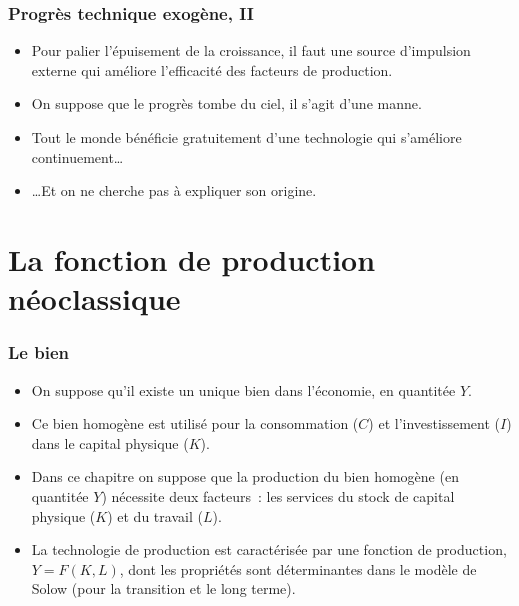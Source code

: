 \documentclass[10pt,notheorems]{beamer}
\theoremstyle{plain}
\theoremstyle{definition} %
\begin{document}
\begin{frame}
  \frametitle{Progrès technique exogène, II}

  \begin{itemize}

  \item Pour palier l'épuisement de la croissance, il faut une source d'impulsion externe qui améliore l'efficacité des facteurs de production.\newline

  \item On suppose que le progrès tombe du ciel, il s'agit d'une manne.\newline

  \item Tout le monde bénéficie gratuitement d'une technologie qui s'améliore continuement\ldots\newline

  \item \ldots Et on ne cherche pas à expliquer son origine.

  \end{itemize}
\end{frame}


\section{La fonction de production néoclassique}

\begin{frame}
  \frametitle{Le bien}

  \begin{itemize}

  \item On suppose qu'il existe un unique bien dans l'économie, en quantitée $Y$.\newline

  \item Ce bien homogène est utilisé pour la consommation ($C$) et l'investissement ($I$) dans le capital physique ($K$).\newline

  \item Dans ce chapitre on suppose que la production du bien homogène (en quantitée $Y$) nécessite deux facteurs~: les services du stock de capital physique ($K$) et du travail ($L$).\newline

  \item La technologie de production est caractérisée par une fonction de production, $Y = F(K,L)$, dont les propriétés sont déterminantes dans le modèle de Solow (pour la transition et le long terme).\newline

  \end{itemize}

\end{frame}
\end{document}
